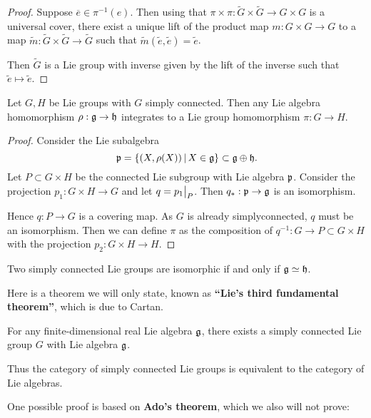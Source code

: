 \documentclass[11pt, english]{article}
\begin{document}
\begin{proof}
  Suppose $\overline e \in \pi^{-1}(e)$. Then using that $\pi \times \pi: \widetilde G \times \widetilde G \to G \times G$ is a universal cover, there exist a unique lift of the product map $m: G \times G \to G$ to a map $\widetilde m: \widetilde G \times \widetilde G \to \widetilde G$ such that $\widetilde m (\widetilde e, \widetilde e) = \widetilde e$.

Then $\widetilde G$ is a Lie group with inverse given by the lift of the inverse such that $\widetilde e \mapsto \widetilde e$.
\end{proof}

\begin{thm}
\label{thmsimply}
  Let $G,H$ be Lie groups with $G$ simply connected. Then any Lie algebra homomorphism $\rho:\mathfrak g \to \mathfrak h$ integrates to a Lie group homomorphism $\pi:G \to H$.
\end{thm}

\begin{proof}
  Consider the Lie subalgebra
$$
\mathfrak{p} = \{ (X,\rho(X)) \, | \, X \in \mathfrak g \} \subset \mathfrak g \oplus \mathfrak h.
$$
Let $P \subset G \times H$ be the connected Lie subgroup with Lie algebra $\mathfrak{p}$. Consider the projection $p_1: G \times H \to G$ and let $q = \restr{p_1}{P}$. Then $q_\ast : \mathfrak{p} \to \mathfrak g$ is an isomorphism. 

Hence $q:P \to G$ is a covering map. As $G$ is already simplyconnected, $q$ must be an isomorphism. Then we can define $\pi$ as the composition of $q^{-1}:G \to P \subset G \times H$ with the projection $p_2:G \times H \to H$.
\end{proof}

\begin{corr}
 Two simply connected Lie groups are isomorphic if and only if $\mathfrak g \simeq \mathfrak h$.
\end{corr}

Here is a theorem we will only state, known as \textbf{``Lie's third fundamental theorem''}, which is due to Cartan.

\begin{thm}
For any finite-dimensional real Lie algebra $\mathfrak g$, there exists a simply connected Lie group $G$ with Lie algebra $\mathfrak g$.
\end{thm}

Thus the category of simply connected Lie groups is equivalent to the category of Lie algebras.

One possible proof is based on \textbf{Ado's theorem}, which we also will not prove: 
\end{document}

